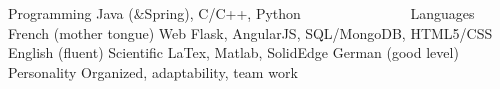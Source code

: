 

\begin{cvskillsF}

  \cvskillF
    {Programming} %
    {Java (\&Spring), C/C++, Python} %
    {\ \ \ \ \ \ \ \ \ \ \ \ \ \ \ Languages} %
    {French (mother tongue)} %
  \cvskillF
    {Web} %
    {Flask, AngularJS, SQL/MongoDB, HTML5/CSS} %
    {} %
    {English (fluent)} %
  \cvskillF
    {Scientific} %
    {LaTex, Matlab, SolidEdge} %
    {} %
    {German (good level)} %
  \cvskillF
    {} %
    {} %
    {Personality} %
    {Organized, adaptability, team work} %
\end{cvskillsF}
